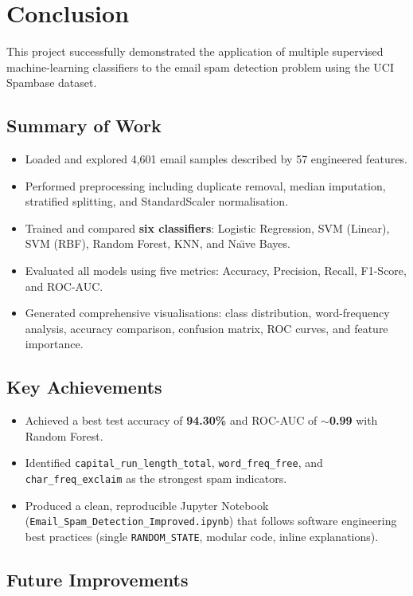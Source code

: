 \documentclass[12pt, a4paper]{article}
\begin{document}
\section{Conclusion}

This project successfully demonstrated the application of multiple supervised machine-learning classifiers to the email spam detection problem using the UCI Spambase dataset.

\subsection{Summary of Work}
\begin{itemize}
    \item Loaded and explored 4,601 email samples described by 57 engineered features.
    \item Performed preprocessing including duplicate removal, median imputation, stratified splitting, and StandardScaler normalisation.
    \item Trained and compared \textbf{six classifiers}: Logistic Regression, SVM (Linear), SVM (RBF), Random Forest, KNN, and Na\"{\i}ve Bayes.
    \item Evaluated all models using five metrics: Accuracy, Precision, Recall, F1-Score, and ROC-AUC.
    \item Generated comprehensive visualisations: class distribution, word-frequency analysis, accuracy comparison, confusion matrix, ROC curves, and feature importance.
\end{itemize}

\subsection{Key Achievements}
\begin{itemize}
    \item Achieved a best test accuracy of \textbf{94.30\%} and ROC-AUC of \textbf{$\sim$0.99} with Random Forest.
    \item Identified \texttt{capital\_run\_length\_total}, \texttt{word\_freq\_free}, and \texttt{char\_freq\_exclaim} as the strongest spam indicators.
    \item Produced a clean, reproducible Jupyter Notebook (\texttt{Email\_Spam\_Detection\_Improved.ipynb}) that follows software engineering best practices (single \texttt{RANDOM\_STATE}, modular code, inline explanations).
\end{itemize}

\subsection{Future Improvements}
\end{document}
